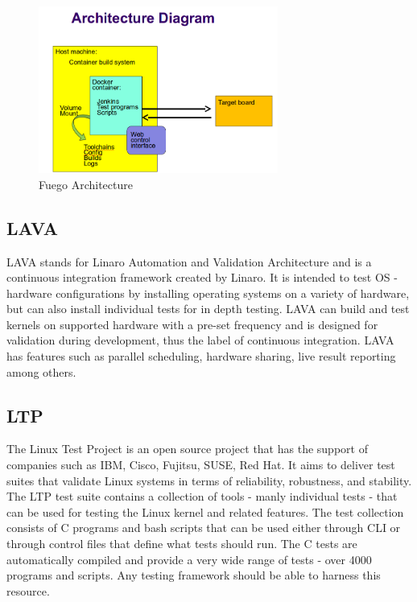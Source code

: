 \begin{figure}[h!]
  \centering
	\includegraphics[width=0.7\textwidth]{images/fuego-arch.png}
    \caption{Fuego Architecture}
\end{figure}

\subsection{LAVA}

LAVA stands for Linaro Automation and Validation Architecture and is a continuous integration framework created by Linaro. It is intended to test OS - hardware configurations by installing operating systems on a variety of hardware, but can also install individual tests for in depth testing. LAVA can build and test kernels on supported hardware with a pre-set frequency and is designed for validation during development, thus the label of continuous integration. LAVA has features such as parallel scheduling, hardware sharing, live result reporting among others.
\subsection{LTP}

The Linux Test Project is an open source project that has the support of companies such as IBM, Cisco, Fujitsu, SUSE, Red Hat. It aims to deliver test suites that validate Linux systems in terms of reliability, robustness, and stability. The LTP test suite contains a collection of tools - manly individual tests - that can be used for testing the Linux kernel and related features. The test collection consists of C programs and bash scripts that can be used either through CLI or through control files that define what tests should run. The C tests are automatically compiled and provide a very wide range of tests - over 4000 programs and scripts. Any testing framework should be able to harness this resource.

